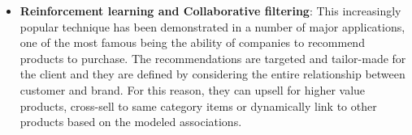 \begin{itemize}
    \item \textbf{Reinforcement learning and Collaborative filtering}: This increasingly popular technique has been demonstrated in a number of major applications, one of the most famous being the ability of companies to recommend products to purchase. The recommendations are targeted and tailor-made for the client and they are defined by considering the entire relationship between customer and brand. For this reason, they can upsell for higher value products, cross-sell to same category items or dynamically link to other products based on the modeled associations.
  \end{itemize} 

